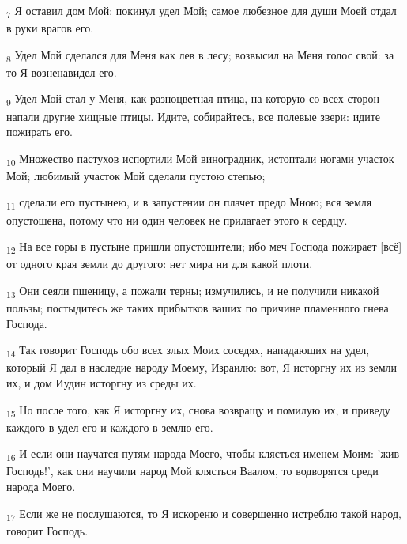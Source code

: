 \begin{tcolorbox}
\textsubscript{7} Я оставил дом Мой; покинул удел Мой; самое любезное для души Моей отдал в руки врагов его.
\end{tcolorbox}
\begin{tcolorbox}
\textsubscript{8} Удел Мой сделался для Меня как лев в лесу; возвысил на Меня голос свой: за то Я возненавидел его.
\end{tcolorbox}
\begin{tcolorbox}
\textsubscript{9} Удел Мой стал у Меня, как разноцветная птица, на которую со всех сторон напали другие хищные птицы. Идите, собирайтесь, все полевые звери: идите пожирать его.
\end{tcolorbox}
\begin{tcolorbox}
\textsubscript{10} Множество пастухов испортили Мой виноградник, истоптали ногами участок Мой; любимый участок Мой сделали пустою степью;
\end{tcolorbox}
\begin{tcolorbox}
\textsubscript{11} сделали его пустынею, и в запустении он плачет предо Мною; вся земля опустошена, потому что ни один человек не прилагает этого к сердцу.
\end{tcolorbox}
\begin{tcolorbox}
\textsubscript{12} На все горы в пустыне пришли опустошители; ибо меч Господа пожирает [всё] от одного края земли до другого: нет мира ни для какой плоти.
\end{tcolorbox}
\begin{tcolorbox}
\textsubscript{13} Они сеяли пшеницу, а пожали терны; измучились, и не получили никакой пользы; постыдитесь же таких прибытков ваших по причине пламенного гнева Господа.
\end{tcolorbox}
\begin{tcolorbox}
\textsubscript{14} Так говорит Господь обо всех злых Моих соседях, нападающих на удел, который Я дал в наследие народу Моему, Израилю: вот, Я исторгну их из земли их, и дом Иудин исторгну из среды их.
\end{tcolorbox}
\begin{tcolorbox}
\textsubscript{15} Но после того, как Я исторгну их, снова возвращу и помилую их, и приведу каждого в удел его и каждого в землю его.
\end{tcolorbox}
\begin{tcolorbox}
\textsubscript{16} И если они научатся путям народа Моего, чтобы клясться именем Моим: 'жив Господь!', как они научили народ Мой клясться Ваалом, то водворятся среди народа Моего.
\end{tcolorbox}
\begin{tcolorbox}
\textsubscript{17} Если же не послушаются, то Я искореню и совершенно истреблю такой народ, говорит Господь.
\end{tcolorbox}
